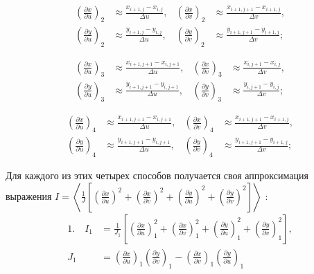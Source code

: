\documentclass[a4paper,14pt,russian]{extreport}
\renewcommand{\_}{\kern-1.5pt\textunderscore\kern-1.5pt}
\begin{document}
\begin{align}
\left(\frac{\partial x}{\partial u}\right)_2 &\approx \frac{x_{i+1, j}-x_{i, j}}{\Delta u}, &
\left(\frac{\partial x}{\partial v}\right)_2 &\approx \frac{x_{i+1, j+1}-x_{i+1, j}}{\Delta v}, \\
\left(\frac{\partial y}{\partial u}\right)_2 &\approx \frac{y_{i+1, j}-y_{i, j}}{\Delta u}, &
\left(\frac{\partial y}{\partial v}\right)_2 &\approx \frac{y_{i+1, j+1}-y_{i+1, j}}{\Delta v};
\end{align}

\begin{align}
\left(\frac{\partial x}{\partial u}\right)_3 &\approx \frac{x_{i+1, j+1}-x_{i, j+1}}{\Delta u}, &
\left(\frac{\partial x}{\partial v}\right)_3 &\approx \frac{x_{i, j+1}-x_{i, j}}{\Delta v}, \\
\left(\frac{\partial y}{\partial u}\right)_3 &\approx \frac{y_{i+1, j+1}-y_{i, j+1}}{\Delta u}, &
\left(\frac{\partial y}{\partial v}\right)_3 &\approx \frac{y_{i, j+1}-y_{i, j}}{\Delta v};
\end{align}

\begin{align}
\left(\frac{\partial x}{\partial u}\right)_4 &\approx \frac{x_{i+1, j+1}-x_{i, j+1}}{\Delta u}, &
\left(\frac{\partial x}{\partial v}\right)_4 &\approx \frac{x_{i+1, j+1}-x_{i+1, j}}{\Delta v}, \\
\left(\frac{\partial y}{\partial u}\right)_4 &\approx \frac{y_{i+1, j+1}-y_{i, j+1}}{\Delta u}, &
\left(\frac{\partial y}{\partial v}\right)_4 &\approx \frac{y_{i+1, j+1}-y_{i+1, j}}{\Delta v};
\end{align}

Для каждого из этих четырех способов получается своя аппроксимация выражения $I=\left\langle\frac{1}{J}\left[\left(\frac{\partial x}{\partial u}\right)^2+\left(\frac{\partial x}{\partial v}\right)^2+\left(\frac{\partial y}{\partial u}\right)^2+\left(\frac{\partial y}{\partial v}\right)^2\right]\right\rangle$ :
\begin{align}
1. \quad I_1 &= \frac{1}{J_1}\left[\left(\frac{\partial x}{\partial u}\right)_1^2 + \left(\frac{\partial x}{\partial v}\right)_1^2 + \left(\frac{\partial y}{\partial u}\right)_1^2 + \left(\frac{\partial y}{\partial v}\right)_1^2\right], \\
J_1 &= \left(\frac{\partial x}{\partial u}\right)_1\left(\frac{\partial y}{\partial v}\right)_1 - \left(\frac{\partial x}{\partial v}\right)_1\left(\frac{\partial y}{\partial u}\right)_1
\end{align}
\end{document}
